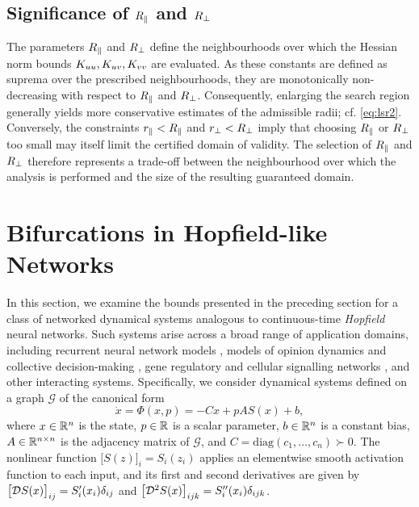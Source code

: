 \documentclass[a4paper]{cas-dc}
\begin{document}
\subsection{Significance of \(R_{\parallel}\) and \(R_{\perp}\)}
\label{ssec:lsr2-R}

The parameters \(R_{\parallel}\) and \(R_{\perp}\) define the neighbourhoods over which the Hessian norm bounds \(K_{uu},K_{uv},K_{vv}\) are evaluated. As these constants are defined as suprema over the prescribed neighbourhoods, they are monotonically non-decreasing with respect to \(R_{\parallel}\) and \(R_{\perp}\). Consequently, enlarging the search region generally yields more conservative estimates of the admissible radii; cf. \eqref{eq:lsr2}. Conversely, the constraints \(r_{\parallel}<R_{\parallel}\) and \(r_{\perp}<R_{\perp}\) imply that choosing \(R_{\parallel}\) or \(R_{\perp}\) too small may itself limit the certified domain of validity. The selection of \(R_{\parallel}\) and \(R_{\perp}\) therefore represents a trade-off between the neighbourhood over which the analysis is performed and the size of the resulting guaranteed domain.



\section{Bifurcations in Hopfield-like Networks}
\label{sec:NLD}

In this section, we examine the bounds presented in the preceding section for a class of networked dynamical systems analogous to continuous-time \emph{Hopfield} neural networks. Such systems arise across a broad range of application domains, including recurrent neural network models \cite{hopfield1984neurons,betteti2025input,wilson1972excitatory,sompolinsky1988chaos}, models of opinion dynamics and collective decision-making \cite{franci2015realization,gray2018multiagent,fontan2017multiequilibria,leonard2024fast}, gene regulatory and cellular signalling networks \cite{glass1973logical,cohen1983absolute}, and other interacting systems.
Specifically, we consider dynamical systems defined on a graph \(\mathcal{G}\) of the canonical form
\begin{equation}
    \dot{x} = \Phi(x,p) = -Cx + pAS(x) + b,
    \label{eq:hopfield}
\end{equation}
where \(x \in \R[n]\) is the state, \(p \in \R\) is a scalar parameter, \(b \in \R[n]\) is a constant bias, \(A \in \R[n \times n]\) is the adjacency matrix of \(\mathcal{G}\), and \(C = \mathrm{diag}(c_{1},\dots,c_{n}) \succ 0\). The nonlinear function \(\bigl[S(z)\bigr]_{i}=S_{i}(z_{i})\) applies an elementwise smooth activation function to each input, and its first and second derivatives are given by \(\bigl[\mathcal{D}_{} S(x)\bigr]_{ij}=S'_{i}(x_{i})\delta_{ij}\) and \(\bigl[\mathcal{D}_{}^2S(x)\bigr]_{ijk}=S''_{i}(x_{i})\delta_{ijk}\).
\end{document}

